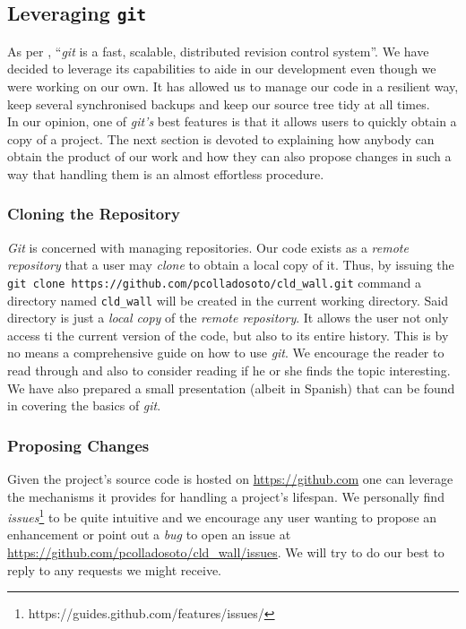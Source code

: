         \subsection{Leveraging \texttt{git}}
            As per \cite{bib:man-git}, ``\textit{git} is a fast, scalable, distributed revision control system''. We have decided to leverage its capabilities to aide in our development even though we were working on our own. It has allowed us to manage our code in a resilient way, keep several synchronised backups and keep our source tree tidy at all times.\\

            In our opinion, one of \textit{git's} best features is that it allows users to quickly obtain a copy of a project. The next section is devoted to explaining how anybody can obtain the product of our work and how they can also propose changes in such a way that handling them is an almost effortless procedure.\\

            \subsubsection{Cloning the Repository}
                \textit{Git} is concerned with managing repositories. Our code exists as a \textit{remote repository} that a user may \textit{clone} to obtain a local copy of it. Thus, by issuing the \texttt{git clone https://github.com/pcolladosoto/cld\_wall.git} command a directory named \texttt{cld\_wall} will be created in the current working directory. Said directory is just a \textit{local copy} of the \textit{remote repository}. It allows the user not only access ti the current version of the code, but also to its entire history. This is by no means a comprehensive guide on how to use \textit{git}. We encourage the reader to read through \cite{bib:man-git} and also to consider reading \cite{bib:pro-git} if he or she finds the topic interesting. We have also prepared a small presentation (albeit in Spanish) that can be found in \cite{bib:git-talk} covering the basics of \textit{git}.\\

            \subsubsection{Proposing Changes}
                Given the project's source code is hosted on \url{https://github.com} one can leverage the mechanisms it provides for handling a project's lifespan. We personally find \textit{issues}\footnote{https://guides.github.com/features/issues/} to be quite intuitive and we encourage any user wanting to propose an enhancement or point out a \textit{bug} to open an issue at \url{https://github.com/pcolladosoto/cld\_wall/issues}. We will try to do our best to reply to any requests we might receive.\\

